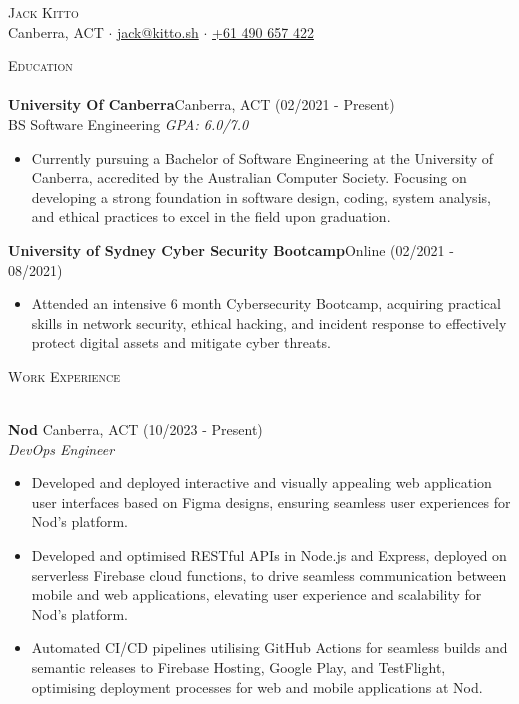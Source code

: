 \documentclass[a4paper]{article}
\newcommand{\lineunder} {
    \vspace*{-8pt} \\
    \hspace*{-18pt} \hrulefill \\
}
\newcommand{\header} [1] {
    {\hspace*{-18pt}\vspace*{6pt} \textsc{#1}}
    \vspace*{-6pt} \lineunder
}
\begin{document}
    \vspace*{-40pt}

\vspace*{-10pt}
\begin{center}
  {\Huge \scshape {Jack Kitto}}\\
  Canberra, ACT $\cdot$ \href{mailto:jack@kitto.sh}{jack@kitto.sh} $\cdot$ \href{tel:+61 490 657 422}{+61 490 657 422} \\
\end{center}

      \header{Education}
      \textbf{University Of Canberra}\hfill Canberra, ACT (02/2021 - Present)\\
BS Software Engineering \textit{GPA: 6.0/7.0} \hfill \\
\begin{itemize} \itemsep 1pt
  \item Currently pursuing a Bachelor of Software Engineering at the University of Canberra, accredited by the Australian Computer Society. Focusing on developing a strong foundation in software design, coding, system analysis, and ethical practices to excel in the field upon graduation.
\end{itemize}
      \textbf{University of Sydney Cyber Security Bootcamp}\hfill Online (02/2021 - 08/2021)\\
\begin{itemize} \itemsep 1pt
  \item Attended an intensive 6 month Cybersecurity Bootcamp, acquiring practical skills in network security, ethical hacking, and incident response to effectively protect digital assets and mitigate cyber threats.
\end{itemize}
      \header{Work Experience}
      \vspace{1mm}

      \textbf{Nod} \hfill Canberra, ACT (10/2023 - Present)\\
          \textit{DevOps Engineer} 
\begin{itemize} \itemsep 1pt
      \item Developed and deployed interactive and visually appealing web application user interfaces based on Figma designs, ensuring seamless user experiences for Nod's platform.
      \item Developed and optimised RESTful APIs in Node.js and Express, deployed on serverless Firebase cloud functions, to drive seamless communication between mobile and web applications, elevating user experience and scalability for Nod's platform.
      \item Automated CI/CD pipelines utilising GitHub Actions for seamless builds and semantic releases to Firebase Hosting, Google Play, and TestFlight, optimising deployment processes for web and mobile applications at Nod.
\end{itemize}
\end{document}
